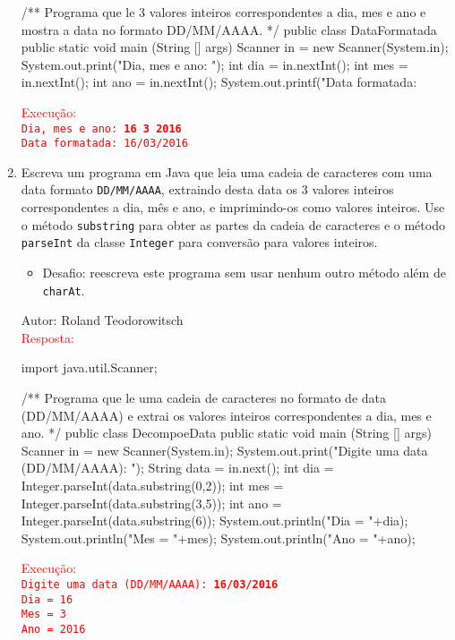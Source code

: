 \documentclass[onecolumn,a4paper,10pt]{report}
\newcommand{\+}{\, + \,}
\newcommand{\<}{\hspace*{-0.4cm}}
\begin{document}
\begin{enumerate}[1.]
\begin{javacode}
/**
   Programa que le 3 valores inteiros correspondentes a dia, mes e ano e mostra
   a data no formato DD/MM/AAAA.
*/
public class DataFormatada {
    public static void main (String [] args) {
        Scanner in = new Scanner(System.in);
        System.out.print("Dia, mes e ano: ");
        int dia = in.nextInt();
        int mes = in.nextInt();
        int ano = in.nextInt();
        System.out.printf("Data formatada: %
    }
}
\end{javacode}
\textcolor{red}{Execução:\\
\texttt{Dia, mes e ano: \textbf{16 3 2016}\\
Data formatada: 16/03/2016}
}

\item Escreva um programa em Java que leia uma cadeia de caracteres com uma data formato \texttt{DD/MM/AAAA}, extraindo desta data os 3 valores inteiros correspondentes a dia, mês e ano, e imprimindo-os como valores inteiros. Use o método \texttt{substring} para obter as partes da cadeia de caracteres e o método \texttt{parseInt} da classe \texttt{Integer} para conversão para valores inteiros.
\begin{itemize}
\item Desafio: reescreva este programa sem usar nenhum outro método além de \texttt{charAt}.
\end{itemize}
{\tiny Autor: Roland Teodorowitsch}\\
\textcolor{red}{Resposta:}\\
\begin{javacode}
import java.util.Scanner;

/**
   Programa que le uma cadeia de caracteres no formato de data (DD/MM/AAAA) e
   extrai os valores inteiros correspondentes a dia, mes e ano.
*/
public class DecompoeData {
    public static void main (String [] args) {
        Scanner in = new Scanner(System.in);
        System.out.print("Digite uma data (DD/MM/AAAA): ");
        String data = in.next();
        int dia = Integer.parseInt(data.substring(0,2));
        int mes = Integer.parseInt(data.substring(3,5));
        int ano = Integer.parseInt(data.substring(6));
        System.out.println("Dia = "+dia);
        System.out.println("Mes = "+mes);
        System.out.println("Ano = "+ano);
    }
}
\end{javacode}
\textcolor{red}{Execução:\\
\texttt{Digite uma data (DD/MM/AAAA): \textbf{16/03/2016}\\
Dia = 16\\
Mes = 3\\
Ano = 2016}
}


\end{enumerate}
\end{document}

